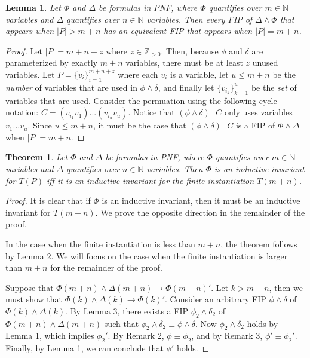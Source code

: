 \documentclass[12pt]{article}
\newtheorem{lemma}{Lemma}
\newtheorem{theorem}{Theorem}
\newcommand{\msp}{\text{ }}
\begin{document}
\begin{lemma}
  Let $\Phi$ and $\Delta$ be formulas in PNF, where $\Phi$ quantifies over $m \in \mathbb{N}$ variables and $\Delta$ quantifies over $n \in \mathbb{N}$ variables.  Then every FIP of $\Delta \land \Phi$ that appears when $|P| > m+n$ has an equivalent FIP that appears when $|P| = m+n$.
\end{lemma}
\begin{proof}
  Let $|P| = m + n + z$ where $z \in \mathbb{Z}_{>0}$.  Then, because $\phi$ and $\delta$ are parameterized by exactly $m+n$ variables, there must be at least $z$ unused variables.  Let $P = \{v_i\}_{i=1}^{m+n+z}$ where each $v_i$ is a variable, let $u \leq m+n$ be the \textit{number} of variables that are used in $\phi \land \delta$, and finally let $\{v_{i_k}\}_{k=1}^{u}$ be the \textit{set} of variables that are used.  Consider the permuation using the following cycle notation: $C = (v_{i_1} v_1)...(v_{i_u} v_u)$.  Notice that $(\phi \land \delta) \msp C$ only uses variables $v_1 ... v_u$.  Since $u \leq m+n$, it must be the case that $(\phi \land \delta) \msp C$ is a FIP of $\Phi \land \Delta$ when $|P| = m+n$.
\end{proof}

\begin{theorem}
  Let $\Phi$ and $\Delta$ be formulas in PNF, where $\Phi$ quantifies over $m \in \mathbb{N}$ variables and $\Delta$ quantifies over $n \in \mathbb{N}$ variables.  Then $\Phi$ is an inductive invariant for $T(P)$ iff it is an inductive invariant for the finite instantiation $T(m+n)$.
\end{theorem}
\begin{proof}
  It is clear that if $\Phi$ is an inductive invariant, then it must be an inductive invariant for $T(m+n)$.  We prove the opposite direction in the remainder of the proof.

  In the case when the finite instantiation is less than $m+n$, the theorem follows by Lemma 2.  We will focus on the case when the finite instantiation is larger than $m+n$ for the remainder of the proof.

  Suppose that $\Phi(m+n) \land \Delta(m+n) \rightarrow \Phi(m+n)'$.  Let $k > m+n$, then we must show that $\Phi(k) \land \Delta(k) \rightarrow \Phi(k)'$.  Consider an arbitrary FIP $\phi\land\delta$ of $\Phi(k) \land \Delta(k)$.  By Lemma 3, there exists a FIP $\phi_2\land\delta_2$ of $\Phi(m+n) \land \Delta(m+n)$ such that $\phi_2\land\delta_2 \equiv \phi\land\delta$.  Now $\phi_2\land\delta_2$ holds by Lemma 1, which implies $\phi_2'$.  By Remark 2, $\phi \equiv \phi_2$, and by Remark 3, $\phi' \equiv \phi_2'$.  Finally, by Lemma 1, we can conclude that $\phi'$ holds.
\end{proof}
\end{document}
